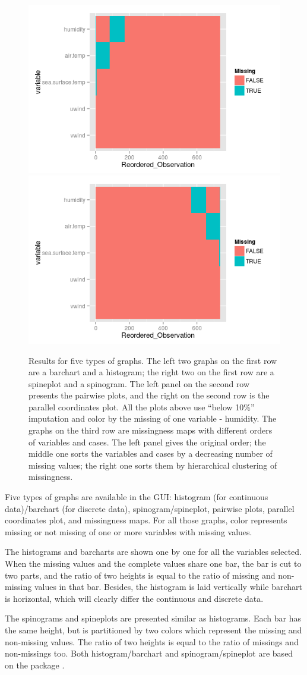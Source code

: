 \documentclass[article]{jss}
\begin{document}
\begin{center}
\begin{figure}[h]
\begin{centering}
\includegraphics[width=.32\textwidth]{fig5-3-2}
\includegraphics[width=.32\textwidth]{fig5-3-3}
\par\end{centering}
\caption{Results for five types of graphs.
The left two graphs on the first row are a barchart and a histogram; the right two on the first row are a spineplot and a spinogram. The left panel on the second row presents the pairwise plots, and the right on the second row is the parallel coordinates plot. All the plots above use ``below 10\%'' imputation and color by the missing of one variable - humidity. The graphs on the third row are missingness maps with different orders of variables and cases. The left panel gives the original order; the middle one sorts the variables and cases by a decreasing number of missing values; the right one sorts them by hierarchical clustering of missingness.}
\label{fig:graphtypes}
\end{figure}
\par\end{center}

Five types of graphs are available in the GUI: histogram (for continuous data)/barchart (for discrete data), spinogram/spineplot, pairwise plots, parallel coordinates plot, and missingness maps. For all those graphs, color represents missing or not missing of one or more variables with missing values. 

The histograms and barcharts are shown one by one for all the variables selected. When the missing values and the complete values share one bar, the bar is cut to two parts, and the ratio of two heights is equal to the ratio of missing and non-missing values in that bar. Besides, the histogram is laid vertically while barchart is horizontal, which will clearly differ the continuous and discrete data.

The spinograms and spineplots are presented similar as histograms. Each bar has the same height, but is partitioned by two colors which represent the missing and non-missing values. The ratio of two heights is equal to the ratio of missings and non-missings too. Both histogram/barchart and spinogram/spineplot are based on the package  \citep{ggplot2}.
\end{document}
